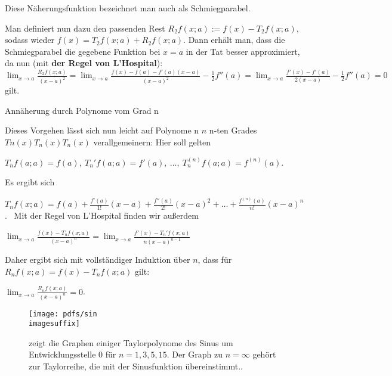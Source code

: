 Diese Näherungsfunktion bezeichnet man auch als Schmiegparabel.

Man definiert nun dazu den passenden Rest $R_2 f(x; a) := f(x) - T_2 f(x; a)$, sodass wieder $f(x) = T_2 f(x; a) + R_2 f(x; a)$. Dann erhält man, dass die Schmiegparabel die gegebene Funktion bei $x=a$ in der Tat besser approximiert, da nun (mit \textbf{der Regel von L’Hospital}):
 $\lim_{x \to a} \frac{R_2 f(x; a)}{(x-a)^2} = \lim_{x \to a} \frac{f(x) - f(a) - f'(a)(x - a)}{(x - a)^2} - \frac{1}{2}f''(a) = \lim_{x \to a} \frac{f'(x) - f'(a)}{2(x - a)} - \frac{1}{2}f''(a) = 0$
gilt.

Annäherung durch Polynome vom Grad n

Dieses Vorgehen lässt sich nun leicht auf Polynome n ${\displaystyle n}$ n-ten Grades $T n ( x ) {\displaystyle T_{n}(x)} T_n(x)$ verallgemeinern: Hier soll gelten

$T_{n}f(a;a)=f(a),\ T_{n}'f(a;a)=f'(a),\ \ldots ,\ T_{n}^{(n)}f(a;a)=f^{(n)}(a)$.



Es ergibt sich \

$T_{n}f(x;a)=f(a)+{\frac {f'(a)}{1!}}(x-a)+{\frac {f''(a)}{2!}}(x-a)^{2}+\ldots +{\frac {f^{(n)}(a)}{n!}}(x-a)^{n}$.
\
Mit der Regel von L’Hospital finden wir außerdem 

$\lim _{x\to a}{\frac {f(x)-T_{n}f(x;a)}{(x-a)^{n}}}=\lim _{x\to a}{\frac {f'(x)-T_{n}'f(x;a)}{n(x-a)^{n-1}}}$

Daher ergibt sich mit vollständiger Induktion über $n$, dass für $R_{n}f(x;a)=f(x)-T_{n}f(x;a)$ gilt:

$\lim_{x \to a} \frac{R_n f(x; a)}{(x-a)^n} = 0$. 

\begin{figure}
  \centering
	\texttt{[image: pdfs/sin\\imagesuffix]}
  \caption[Taylor bei der Arbeit]{zeigt die Graphen einiger Taylorpolynome des Sinus um Entwicklungsstelle $0$ für $n=1,3,5,15$. Der Graph zu $n=\infty$ gehört zur Taylorreihe, die mit der Sinusfunktion übereinstimmt..}
  \label{sin_1}
\end{figure}


    